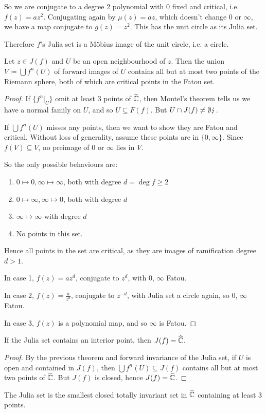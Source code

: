 \documentclass[10pt,a4paper]{article}
\begin{document}
So we are conjugate to a degree 2 polynomial with 0 fixed and critical, i.e. $f(z) = az^2$. Conjugating again by $\mu(z) = az$, which doesn't change 0 or $\infty$, we have a map conjugate to $g(z) = z^2$. This has the unit circle as its Julia set.

Therefore $f$'s Julia set is a M\"obius image of the unit circle, i.e. a circle.

\begin{theorem}
  Let $z \in J(f)$ and $U$ be an open neighbourhood of $z$. Then the union $V \coloneqq \bigcup f^n(U)$ of forward images of $U$ contains all but at most two points of the Riemann sphere, both of which are critical points in the Fatou set.
\end{theorem}
\begin{proof}
  If $\{f^n|_U\}$ omit at least 3 points of $\widehat{\mathbb{C}}$, then Montel's theorem tells us we have a normal family on $U$, and so $U \subseteq F(f)$. But $U \cap J(f)\neq \emptyset \lightning$.

  If $\bigcup f^n(U)$ misses any points, then we want to show they are Fatou and critical. Without loss of generality, assume these points are in $\{0, \infty\}$. Since $f(V) \subseteq V$, no preimage of $0$ or $\infty$ lies in $V$.

  So the only possible behaviours are:
  \begin{enumerate}
    \item $0\mapsto 0, \infty \mapsto \infty$, both with degree $d = \deg f \geq 2$
    \item $0\mapsto \infty, \infty \mapsto 0$, both with degree $d$
    \item $\infty \mapsto \infty$ with degree $d$
    \item No points in this set.
  \end{enumerate}
  Hence all points in the set are critical, as they are images of ramification degree $d > 1$.

  In case 1, $f(z) = az^d$, conjugate to $z^d$, with 0, $\infty$ Fatou.

  In case 2, $f(z) = \frac{a}{z^d}$, conjugate to $z^{-d}$, with Julia set a circle again, so 0, $\infty$ Fatou.

  In case 3, $f(z)$ is a polynomial map, and so $\infty$ is Fatou.
\end{proof}
\begin{corollary}
  If the Julia set contains an interior point, then $J(f) = \widehat{\mathbb{C}}$.
\end{corollary}
\begin{proof}
  By the previous theorem and forward invariance of the Julia set, if $U$ is open and contained in $J(f)$, then $\bigcup f^n(U) \subseteq J(f)$ contains all but at most two points of $\widehat{\mathbb{C}}$. But $J(f)$ is closed, hence $J(f) = \widehat{\mathbb{C}}$.
\end{proof}
The Julia set is the smallest closed totally invariant set in $\widehat{\mathbb{C}}$ containing at least 3 points.
\end{document}
